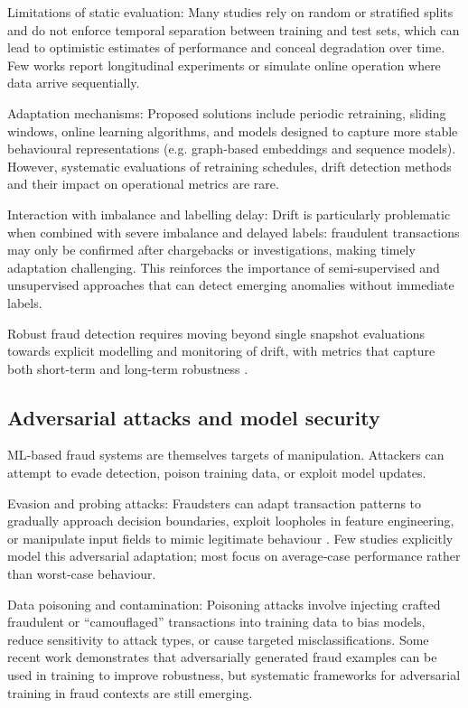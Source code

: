 \documentclass[a4paper,fleqn]{cas-dc}
\begin{document}
Limitations of static evaluation: Many studies rely on random or stratified splits and do not enforce temporal separation between training and test sets, which can lead to optimistic estimates of performance and conceal degradation over time. 
Few works report longitudinal experiments or simulate online operation where data arrive sequentially.

Adaptation mechanisms: Proposed solutions include periodic retraining, sliding windows, online learning algorithms, and models designed to capture more stable behavioural representations (e.g. graph‑based embeddings and sequence models). 
However, systematic evaluations of retraining schedules, drift detection methods and their impact on operational metrics are rare.

Interaction with imbalance and labelling delay: Drift is particularly problematic when combined with severe imbalance and delayed labels: fraudulent transactions may only be confirmed after chargebacks or investigations, making timely adaptation challenging. 
This reinforces the importance of semi‑supervised and unsupervised approaches that can detect emerging anomalies without immediate labels.

Robust fraud detection requires moving beyond single snapshot evaluations towards explicit modelling and monitoring of drift, with metrics that capture both short‑term and long‑term robustness \cite{wu_enhanced_2024}.

\subsection{Adversarial attacks and model security}
ML‑based fraud systems are themselves targets of manipulation. 
Attackers can attempt to evade detection, poison training data, or exploit model updates.

Evasion and probing attacks: Fraudsters can adapt transaction patterns to gradually approach decision boundaries, exploit loopholes in feature engineering, or manipulate input fields to mimic legitimate behaviour \cite{ranganatha_enhancing_2025, sivasubramanian_predicting_2024}. 
Few studies explicitly model this adversarial adaptation; most focus on average‑case performance rather than worst‑case behaviour.

Data poisoning and contamination: Poisoning attacks involve injecting crafted fraudulent or “camouflaged” transactions into training data to bias models, reduce sensitivity to attack types, or cause targeted misclassifications. 
Some recent work demonstrates that adversarially generated fraud examples can be used in training to improve robustness, but systematic frameworks for adversarial training in fraud contexts are still emerging.
\end{document}
